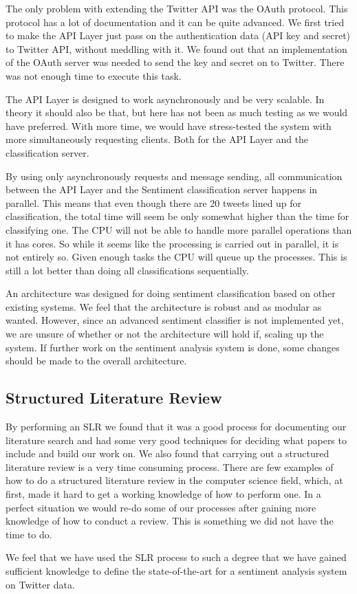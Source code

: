 The only problem with extending the Twitter API was the OAuth protocol. This protocol has a lot of documentation and it can be quite advanced. We first tried to make the API Layer just pass on the authentication data (API key and secret) to Twitter API, without meddling with it. We found out that an implementation of the OAuth server was needed to send the key and secret on to Twitter. There was not enough time to execute this task. 

The API Layer is designed to work asynchronously and be very scalable. In theory it should also be that, but here has not been as much testing as we would have preferred. With more time, we would have stress-tested the system with more simultaneously requesting clients. Both for the API Layer and the classification server. 

By using only asynchronously requests and message sending, all communication between the API Layer and the Sentiment classification server happens in parallel. This means that even though there are 20 tweets lined up for classification, the total time will seem be only somewhat higher than the time for classifying one. The CPU will not be able to handle more parallel operations than it has cores. So while it seems like the processing is carried out in parallel, it is not entirely so. Given enough tasks the CPU will queue up the processes. This is still a lot better than doing all classifications sequentially. 

An architecture was designed for doing sentiment classification based on other existing systems. We feel that the architecture is robust and as modular as wanted. However, since an advanced sentiment classifier is not implemented yet, we are unsure of whether or not the architecture will hold if, scaling up the system. If further work on the sentiment analysis system is done, some changes should be made to the overall architecture. 


\subsection{Structured Literature Review}

By performing an SLR we found that it was a good process for documenting our literature search and had some very good techniques for deciding what papers to include and build our work on. We also found that carrying out a structured literature review is a very time consuming process. There are few examples of how to do a structured literature review in the computer science field, which, at first, made it hard to get a working knowledge of how to perform one. In a perfect situation we would re-do some of our processes after gaining more knowledge of how to conduct a review. This is something we did not have the time to do. 

We feel that we have used the SLR process to such a degree that we have gained sufficient knowledge to define the state-of-the-art for a sentiment analysis system on Twitter data. 
